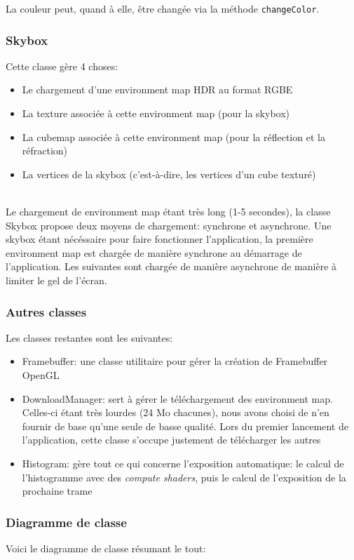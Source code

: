 \documentclass[a4paper,12pt]{article}
\newcommand{\svg}[2][0cm]{
    \begin{figure}[H]
        \centering
        \def\svgwidth{\columnwidth - #1}
        
    \end{figure}
}
\begin{document}
La couleur peut, quand à elle, être changée via la méthode \texttt{changeColor}.

\subsubsection{Skybox}
Cette classe gère 4 choses:
\begin{itemize}
    \item Le chargement d'une environment map HDR au format RGBE
    \item La texture associée à cette environment map (pour la skybox)
    \item La cubemap associée à cette environment map (pour la réflection et la réfraction)
    \item La vertices de la skybox (c'est-à-dire, les vertices d'un cube texturé)
\end{itemize}

\ \\
Le chargement de environment map étant très long (1-5 secondes), la classe Skybox propose deux moyens de chargement:
synchrone et asynchrone. Une skybox étant nécéssaire pour faire fonctionner l'application, la première environment map
est chargée de manière synchrone au démarrage de l'application. Les suivantes sont chargée de manière asynchrone de
manière à limiter le gel de l'écran.

\subsubsection{Autres classes}
Les classes restantes sont les suivantes:
\begin{itemize}
    \item Framebuffer: une classe utilitaire pour gérer la création de Framebuffer OpenGL
    \item DownloadManager: sert à gérer le téléchargement des environment map. Celles-ci étant très lourdes (24 Mo chacunes), nous avons choisi de n'en fournir de base qu'une seule de basse qualité. Lors du premier lancement de l'application, cette classe s'occupe justement de télécharger les autres
    \item Histogram: gère tout ce qui concerne l'exposition automatique: le calcul de l'histogramme avec des \emph{compute shaders}, puis le calcul de l'exposition de la prochaine trame
\end{itemize}

\subsubsection{Diagramme de classe}
Voici le diagramme de classe résumant le tout:
\svg{UML}
\end{document}
